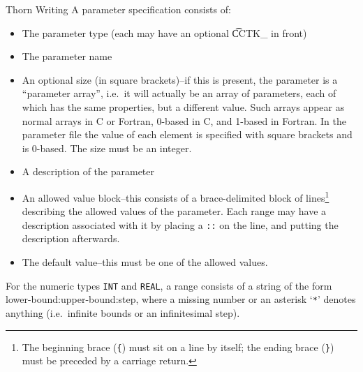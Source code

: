 \begin{cactuspart}{Thorn Writing}
A parameter specification consists of:
\begin{itemize}

\item The parameter type (each may have an optional {\t CCTK\_} in front)

\item The parameter name

\item An optional size (in square brackets)--if this is present, the
  parameter is a ``parameter array'', i.e.\ it will actually be an array
  of parameters, each of which has the same properties, but a different
  value.  Such arrays appear as normal arrays in C or Fortran, 0-based
  in C, and 1-based in Fortran.  In the parameter file the value of
  each element is specified with square brackets and is 0-based.  The
  size must be an integer.

\item A description of the parameter

\item An allowed value block--this consists of a brace-delimited
block of lines\footnote{The beginning brace (\texttt{\{}) must sit on a line by
itself; the ending brace (\texttt{\}}) must be preceded by a carriage return.}
describing the allowed values of the parameter.  Each range may have a
description associated with it by placing a \texttt{::} on the line, and putting
the description afterwards.

\item The default value--this must be one of the allowed values.

\end{itemize}

For the numeric types \texttt{INT} and \texttt{REAL}, a range consists
of a string of the
form lower-bound:upper-bound:step, where a missing number or an asterisk
`\texttt{*}' denotes anything (i.e.\ infinite bounds or an infinitesimal step).


\end{cactuspart}

